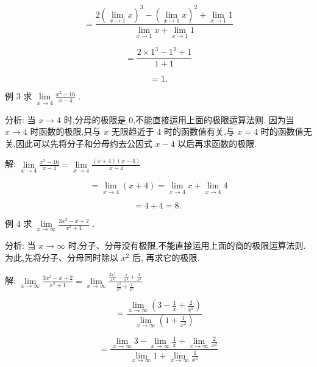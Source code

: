 \documentclass[lang=cn,newtx,10pt,scheme=chinese]{elegantbook}
\begin{document}
\[
= \frac{2{\left( \mathop{\lim }\limits_{{x \rightarrow 1}}x\right) }^{3} - {\left( \mathop{\lim }\limits_{{x \rightarrow 1}}x\right) }^{2} + \mathop{\lim }\limits_{{x \rightarrow 1}}1}{\mathop{\lim }\limits_{{x \rightarrow 1}}x + \mathop{\lim }\limits_{{x \rightarrow 1}}1}
\]

\[
= \frac{2 \times {1}^{3} - {1}^{2} + 1}{1 + 1}
\]

\[
= 1\text{.}
\]

例 3 求 \(\mathop{\lim }\limits_{{x \rightarrow 4}}\frac{{x}^{2} - {16}}{x - 4}\) .

分析: 当 \(x \rightarrow 4\) 时,分母的极限是 0,不能直接运用上面的极限运算法则. 因为当 \(x \rightarrow 4\) 时函数的极限,只与 \(x\) 无限趋近于 4 时的函数值有关,与 \(x = 4\) 时的函数值无关,因此可以先将分子和分母约去公因式 \(x - 4\) 以后再求函数的极限.

解: \(\mathop{\lim }\limits_{{x \rightarrow 4}}\frac{{x}^{2} - {16}}{x - 4} = \mathop{\lim }\limits_{{x \rightarrow 4}}\frac{\left( {x + 4}\right) \left( {x - 4}\right) }{x - 4}\)

\[
= \mathop{\lim }\limits_{{x \rightarrow 4}}\left( {x + 4}\right) = \mathop{\lim }\limits_{{x \rightarrow 4}}x + \mathop{\lim }\limits_{{x \rightarrow 4}}4
\]

\[
= 4 + 4 = 8\text{. }
\]

例 4 求 \(\mathop{\lim }\limits_{{x \rightarrow \infty }}\frac{3{x}^{2} - x + 2}{{x}^{2} + 1}\) .

分析: 当 \(x \rightarrow \infty\) 时,分子、分母没有极限,不能直接运用上面的商的极限运算法则. 为此,先将分子、分母同时除以 \({x}^{2}\) 后, 再求它的极限.

解: \(\mathop{\lim }\limits_{{x \rightarrow \infty }}\frac{3{x}^{2} - x + 2}{{x}^{2} + 1} = \mathop{\lim }\limits_{{x \rightarrow \infty }}\frac{\frac{3{x}^{2}}{{x}^{2}} - \frac{x}{{x}^{2}} + \frac{2}{{x}^{2}}}{\frac{{x}^{2}}{{x}^{2}} + \frac{1}{{x}^{2}}}\)

\[
= \frac{\mathop{\lim }\limits_{{x \rightarrow \infty }}\left( {3 - \frac{1}{x} + \frac{2}{{x}^{2}}}\right) }{\mathop{\lim }\limits_{{x \rightarrow \infty }}\left( {1 + \frac{1}{{x}^{2}}}\right) }
\]

\[
= \frac{\mathop{\lim }\limits_{{x \rightarrow \infty }}3 - \mathop{\lim }\limits_{{x \rightarrow \infty }}\frac{1}{x} + \mathop{\lim }\limits_{{x \rightarrow \infty }}\frac{2}{{x}^{2}}}{\mathop{\lim }\limits_{{x \rightarrow \infty }}1 + \mathop{\lim }\limits_{{x \rightarrow \infty }}\frac{1}{{x}^{2}}}
\]
\end{document}
